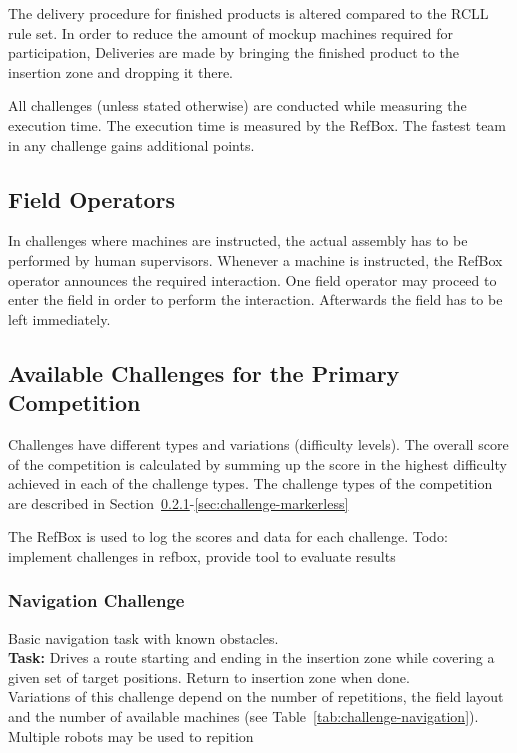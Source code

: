 \documentclass[12pt,twoside]{article}
\newcommand{\refsec}[1]{Section~\ref{#1}}
\newcommand{\reftab}[1]{Table~\ref{#1}}
\begin{document}
The delivery procedure for finished products is altered compared to the
\ac{RCLL} rule set. In order to reduce the amount of mockup machines required
for participation, Deliveries are made by bringing the finished product
to the insertion zone and dropping it there.

All challenges (unless stated otherwise) are conducted while measuring
the execution time. The execution time is measured by the RefBox.
The fastest team in any challenge gains additional points.

\subsection{Field Operators}
In challenges where machines are instructed, the actual assembly has to be
performed by human supervisors. Whenever a machine is instructed, the RefBox
operator announces the required interaction. One field operator may proceed
to enter the field in order to perform the interaction. Afterwards the field
has to be left immediately.

\subsection{Available Challenges for the Primary Competition}
Challenges have different types and variations (difficulty levels).
The overall score of the competition is calculated by summing up the score
in the highest difficulty achieved in each of the challenge types.
The challenge types of the competition are described in
\refsec{sec:challenge-navigation}-\ref{sec:challenge-markerless}

The RefBox is used to log the scores and data for each challenge.
Todo: implement challenges in refbox, provide tool to evaluate results

\subsubsection{Navigation Challenge}\label{sec:challenge-navigation}
Basic navigation task with known obstacles.\\
\textbf{Task:} Drives a route starting and ending in the insertion zone while
covering a given set of target positions. Return to insertion zone when done.\\
Variations of this challenge depend
on the number of repetitions, the field layout and the number of
available machines (see \reftab{tab:challenge-navigation}).
Multiple robots may be used to repition
\end{document}
